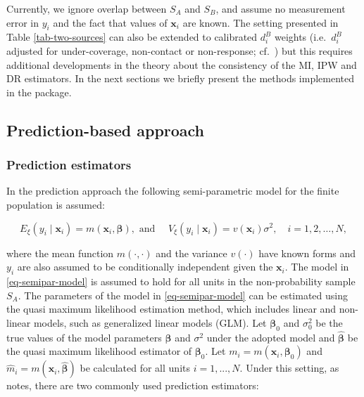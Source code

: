 \documentclass[
]{jss}
\begin{document}
Currently, we ignore overlap between \(S_A\) and \(S_B\), and assume no
measurement error in \(y_i\) and the fact that values of
\(\boldsymbol{x}_i\) are known. The setting presented in Table
\ref{tab-two-sources} can also be extended to calibrated \(d_i^B\)
weights (i.e.~\(d_i^B\) adjusted for under-coverage, non-contact or
non-response; cf.~\cite{sarndal2005estimation}) but this requires
additional developments in the theory about the consistency of the MI,
IPW and DR estimators. In the next sections we briefly present the
methods implemented in the package.

\subsection{Prediction-based approach}\label{sec-prediction}

\subsubsection{Prediction estimators}\label{prediction-estimators}

In the prediction approach the following semi-parametric model for the
finite population is assumed:

\begin{equation}
E_{\xi}\left(y_i \mid \boldsymbol{x}_i\right)=m\left(\boldsymbol{x}_i, \boldsymbol{\beta}\right), \text { and } \quad V_{\xi}\left(y_i \mid \boldsymbol{x}_i\right)=v\left(\boldsymbol{x}_i\right) \sigma^2, \quad i=1,2, \ldots, N,
\label{eq-semipar-model}
\end{equation}

where the mean function \(m(\cdot,\cdot)\) and the variance \(v(\cdot)\)
have known forms and \(y_i\) are also assumed to be conditionally
independent given the \(\boldsymbol{x}_i\). The model in
\eqref{eq-semipar-model} is assumed to hold for all units in the
non-probability sample \(S_A\). The parameters of the model in
\eqref{eq-semipar-model} can be estimated using the quasi maximum
likelihood estimation method, which includes linear and non-linear
models, such as generalized linear models (GLM). Let
\(\boldsymbol{\beta}_0\) and \(\sigma^2_0\) be the true values of the
model parameters \(\boldsymbol{\beta}\) and \(\sigma^2\) under the
adopted model and \(\hat{\boldsymbol{\beta}}\) be the quasi maximum
likelihood estimator of \(\boldsymbol{\beta}_0\). Let
\(m_i=m(\boldsymbol{x}_i, \boldsymbol{\beta}_0)\) and
\(\hat{m}_i=m(\boldsymbol{x}_i, \hat{\boldsymbol{\beta}})\) be
calculated for all units \(i=1,...,N\). Under this setting, as
\citet{wu2022statistical} notes, there are two commonly used prediction
estimators:
\end{document}
